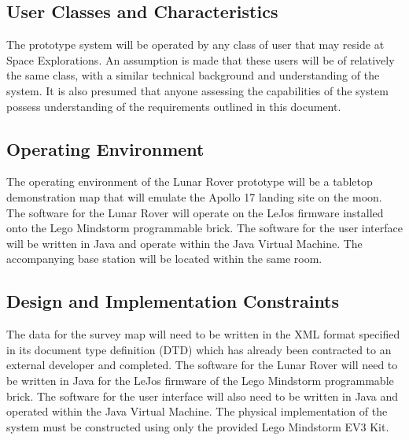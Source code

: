 \documentclass{article}
\begin{document}
\subsection{User Classes and Characteristics}
\begin{adjustwidth}{1em}{0pt}
The prototype system will be operated by any class of user that may reside at Space Explorations. An assumption is made that these users will be of relatively the same class, with a similar technical background and understanding of the system. It is also presumed that anyone assessing the capabilities of the system possess understanding of the requirements outlined in this document.  
\begin{comment}
There is one user class necessary to use this software; the user who will be controlling and observing the Lunar Rover. They will have complete control over the safe navigation of the Lunar Rover around the survey area. This excludes situations which may result in damage or loss of the Lunar Rover. The rover shall never collide with an obstacle or fall into a crater and should alert the user were possible if the user attempts to navigate the Lunar Rover into a dangerous situation. The user may allow the Lunar Rover to leave the boundary area upon request. 
\end{comment}
\end{adjustwidth}
\subsection{Operating Environment}
\begin{adjustwidth}{1em}{0pt}
The operating environment of the Lunar Rover prototype will be a tabletop demonstration map that will emulate the Apollo 17 landing site on the moon. The software for the Lunar Rover will operate on the LeJos firmware installed onto the Lego Mindstorm programmable brick. The software for the user interface will be written in Java and operate within the Java Virtual Machine. The accompanying base station will be located within the same room. 
\end{adjustwidth}
\subsection{Design and Implementation Constraints}
\begin{adjustwidth}{1em}{0pt}
The data for the survey map will need to be written in the XML format specified in its document type definition (DTD) which has already been contracted to an external developer and completed. The software for the Lunar Rover will need to be written in Java for the LeJos firmware of the Lego Mindstorm programmable brick. The software for the user interface will also need to be written in Java and operated within the Java Virtual Machine. The physical implementation of the system must be constructed using only the provided Lego Mindstorm EV3 Kit.
\end{adjustwidth}
\end{document}
